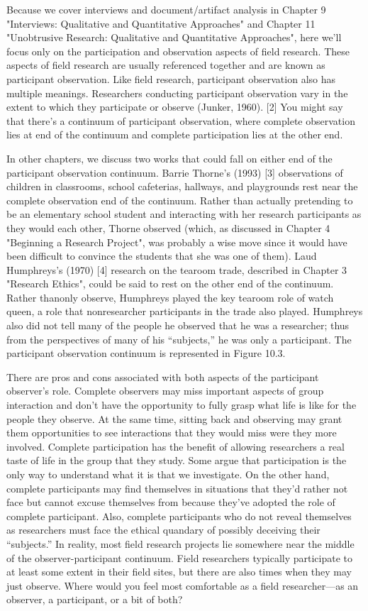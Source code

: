 Because we cover interviews and document/artifact analysis in Chapter 9 "Interviews: Qualitative and Quantitative Approaches" and Chapter 11 "Unobtrusive Research: Qualitative and Quantitative Approaches", here we’ll focus only on the participation and observation aspects of field research. These aspects of field research are usually referenced together and are known as participant observation. Like field research, participant observation also has multiple meanings. Researchers conducting participant observation vary in the extent to which they participate or observe (Junker, 1960). [2] You might say that there’s a continuum of participant observation, where complete observation lies at end of the continuum and complete participation lies at the other end.

In other chapters, we discuss two works that could fall on either end of the participant observation continuum. Barrie Thorne’s (1993) [3] observations of children in classrooms, school cafeterias, hallways, and playgrounds rest near the complete observation end of the continuum. Rather than actually pretending to be an elementary school student and interacting with her research participants as they would each other, Thorne observed (which, as discussed in Chapter 4 "Beginning a Research Project", was probably a wise move since it would have been difficult to convince the students that she was one of them). Laud Humphreys’s (1970) [4] research on the tearoom trade, described in Chapter 3 "Research Ethics", could be said to rest on the other end of the continuum. Rather thanonly observe, Humphreys played the key tearoom role of watch queen, a role that nonresearcher participants in the trade also played. Humphreys also did not tell many of the people he observed that he was a researcher; thus from the perspectives of many of his “subjects,” he was only a participant. The participant observation continuum is represented in Figure 10.3.

There are pros and cons associated with both aspects of the participant observer’s role. Complete observers may miss important aspects of group interaction and don’t have the opportunity to fully grasp what life is like for the people they observe. At the same time, sitting back and observing may grant them opportunities to see interactions that they would miss were they more involved. Complete participation has the benefit of allowing researchers a real taste of life in the group that they study. Some argue that participation is the only way to understand what it is that we investigate. On the other hand, complete participants may find themselves in situations that they’d rather not face but cannot excuse themselves from because they’ve adopted the role of complete participant. Also, complete participants who do not reveal themselves as researchers must face the ethical quandary of possibly deceiving their “subjects.” In reality, most field research projects lie somewhere near the middle of the observer-participant continuum. Field researchers typically participate to at least some extent in their field sites, but there are also times when they may just observe. Where would you feel most comfortable as a field researcher—as an observer, a participant, or a bit of both?

